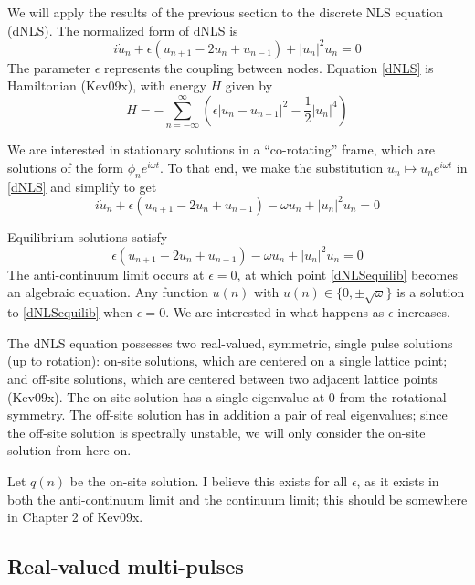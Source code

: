 \documentclass[12pt]{article}
\begin{document}
We will apply the results of the previous section to the discrete NLS equation (dNLS). The normalized form of dNLS is
\begin{equation}\label{dNLS}
i\dot{u}_n + \epsilon(u_{n+1} - 2 u_n + u_{n-1}) + |u_n|^2 u_n = 0
\end{equation}
The parameter $\epsilon$ represents the coupling between nodes. Equation \eqref{dNLS} is Hamiltonian (Kev09x), with energy $H$ given by
\[
H = -\sum_{n=-\infty}^\infty\left( \epsilon|u_n - u_{n-1}|^2
-\frac{1}{2}|u_n|^4 \right)
\]

We are interested in stationary solutions in a ``co-rotating'' frame, which are solutions of the form $\phi_n e^{i \omega t}$. To that end, we make the substitution $u_n \mapsto u_n e^{i \omega t}$ in \eqref{dNLS} and simplify to get
\begin{equation}\label{dNLSrot}
i\dot{u}_n + \epsilon(u_{n+1} - 2 u_n + u_{n-1}) - \omega u_n + |u_n|^2 u_n = 0
\end{equation}

Equilibrium solutions satisfy
\begin{equation}\label{dNLSequilib}
\epsilon(u_{n+1} - 2 u_n + u_{n-1}) - \omega u_n + |u_n|^2 u_n = 0
\end{equation}
The anti-continuum limit occurs at $\epsilon = 0$, at which point \eqref{dNLSequilib} becomes an algebraic equation. Any function $u(n)$ with $u(n) \in \{ 0, \pm \sqrt{\omega}\}$ is a solution to \eqref{dNLSequilib} when $\epsilon = 0$. We are interested in what happens as $\epsilon$ increases.

The dNLS equation possesses two real-valued, symmetric, single pulse solutions (up to rotation): on-site solutions, which are centered on a single lattice point; and off-site solutions, which are centered between two adjacent lattice points (Kev09x). The on-site solution has a single eigenvalue at 0 from the rotational symmetry. The off-site solution has in addition a pair of real eigenvalues; since the off-site solution is spectrally unstable, we will only consider the on-site solution from here on. 

Let $q(n)$ be the on-site solution. I believe this exists for all $\epsilon$, as it exists in both the anti-continuum limit and the continuum limit; this should be somewhere in Chapter 2 of Kev09x.

\subsection{Real-valued multi-pulses}
\end{document}
